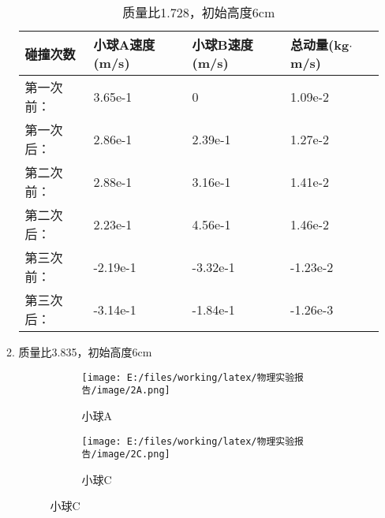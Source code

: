 \documentclass[UTF8]{article}
\begin{document}
\begin{enumerate}
\begin{enumerate}[left=2em, label=\arabic*)]
\begin{table}[H]
\begin{tabularx}{\textwidth}
{                                    ||
                                }
                                    \hline
                                    碰撞次数 & 小球A速度(m/s) & 小球B速度(m/s) & 总动量(kg$\cdot$m/s)\\ \hline
                                    第一次前： & 3.65e-1 & 0 & 1.09e-2 \\ \hline
                                    第一次后： & 2.86e-1 & 2.39e-1 & 1.27e-2 \\ \hline
                                    第二次前： & 2.88e-1 & 3.16e-1 & 1.41e-2\\ \hline
                                    第二次后： & 2.23e-1 & 4.56e-1 & 1.46e-2 \\ \hline
                                    第三次前： & -2.19e-1 & -3.32e-1 & -1.23e-2 \\ \hline
                                    第三次后： & -3.14e-1 & -1.84e-1 & -1.26e-3\\ \hline
                                    
                                \end{tabularx}
                                \caption{质量比1.728，初始高度6cm\protect\footnotemark}
                                \label{form:1.728-6}
                                
                            \end{table}
                        \item 质量比3.835，初始高度6cm
                            \begin{figure}[H]
                                \centering
                                \begin{subfigure}{0.45\textwidth}
                                    \centering
                                    \texttt{[image: E:/files/working/latex/物理实验报告/image/2A.png]}
                                    \caption{小球A}
                                    \label{fig:2A}
                                \end{subfigure}
                                \hfill
                                \begin{subfigure}{0.45\textwidth}
                                    \centering
                                    \texttt{[image: E:/files/working/latex/物理实验报告/image/2C.png]}
                                    \caption{小球C}
                                    \label{fig:C}
                                    

\end{subfigure}
\end{figure}
\end{enumerate}
\end{enumerate}
\end{document}
